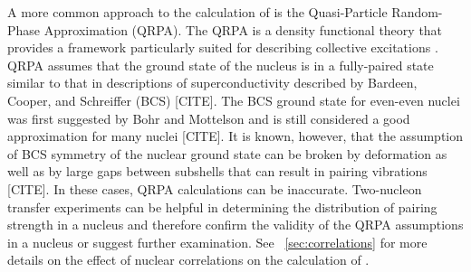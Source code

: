 A more common approach to the calculation of \NME is the Quasi-Particle Random-Phase Approximation (QRPA).  The QRPA is a density functional theory that provides a framework particularly suited for describing collective excitations \citep{Casten}.  QRPA assumes that the ground state of the nucleus is in a fully-paired state \citep{BenderSCMF} similar to that in descriptions of superconductivity described by Bardeen, Cooper, and Schreiffer (BCS) [CITE].  The BCS ground state for even-even nuclei was first suggested by Bohr and Mottelson \citep{nucleiBCS} and is still considered a good approximation for many nuclei [CITE].  It is known, however, that the assumption of BCS symmetry of the nuclear ground state can be broken by deformation as well as by large gaps between subshells that can result in pairing vibrations [CITE].  In these cases, QRPA calculations can be inaccurate.  Two-nucleon transfer experiments can be helpful in determining the distribution of pairing strength in a nucleus \citep{Yoshida} and therefore confirm the validity of the QRPA assumptions in a nucleus or suggest further examination.  See {\sect}~\ref{sec:correlations} for more details on the effect of nuclear correlations on the calculation of \NME. 

